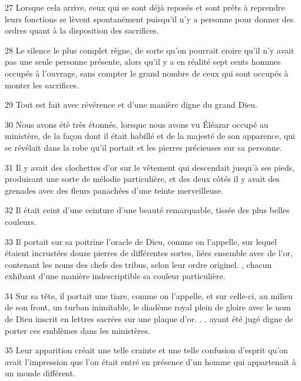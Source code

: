\par 27 Lorsque cela arrive, ceux qui se sont déjà reposés et sont prêts à reprendre leurs fonctions se lèvent spontanément puisqu'il n'y a personne pour donner des ordres quant à la disposition des sacrifices.

\par 28 Le silence le plus complet règne, de sorte qu'on pourrait croire qu'il n'y avait pas une seule personne présente, alors qu'il y a en réalité sept cents hommes occupés à l'ouvrage, sans compter le grand nombre de ceux qui sont occupés à monter les sacrifices.

\par 29 Tout est fait avec révérence et d'une manière digne du grand Dieu.

\par 30 Nous avons été très étonnés, lorsque nous avons vu Éléazar occupé au ministère, de la façon dont il était habillé et de la majesté de son apparence, qui se révélait dans la robe qu'il portait et les pierres précieuses sur sa personne.

\par 31 Il y avait des clochettes d'or sur le vêtement qui descendait jusqu'à ses pieds, produisant une sorte de mélodie particulière, et des deux côtés il y avait des grenades avec des fleurs panachées d'une teinte merveilleuse.

\par 32 Il était ceint d'une ceinture d'une beauté remarquable, tissée des plus belles couleurs.

\par 33 Il portait sur sa poitrine l'oracle de Dieu, comme on l'appelle, sur lequel étaient incrustées douze pierres de différentes sortes, liées ensemble avec de l'or, contenant les noms des chefs des tribus, selon leur ordre originel. , chacun exhibant d'une manière indescriptible sa couleur particulière.

\par 34 Sur sa tête, il portait une tiare, comme on l'appelle, et sur celle-ci, au milieu de son front, un turban inimitable, le diadème royal plein de gloire avec le nom de Dieu inscrit en lettres sacrées sur une plaque d'or. . . ayant été jugé digne de porter ces emblèmes dans les ministères.

\par 35 Leur apparition créait une telle crainte et une telle confusion d'esprit qu'on avait l'impression que l'on était entré en présence d'un homme qui appartenait à un monde différent.

